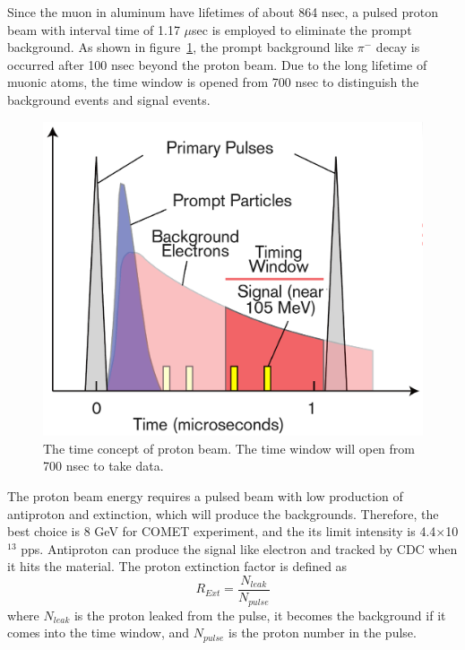 Since the muon in aluminum have lifetimes of about 864 nsec, a pulsed proton beam with interval time of 1.17 $\mu$sec is employed to eliminate the prompt background.
As shown in figure~\ref{time}, the prompt background like $\pi^-$ decay is occurred after 100 nsec beyond the proton beam.
Due to the long lifetime of muonic atoms, the time window is opened from 700 nsec to distinguish the background events and signal events.
\begin{figure}[H]
 \centering
 \includegraphics[scale=0.37]{chapter1/fig/time.pdf}
 \caption{The time concept of proton beam. The time window will open from 700 nsec to take data.}
 \label{time}
\end{figure}
The proton beam energy requires a pulsed beam with low production of antiproton and extinction, which will produce the backgrounds.
Therefore, the best choice is 8 GeV for COMET experiment, and the its limit intensity is 4.4$\times$10$^{13}$ pps.
Antiproton can produce the signal like electron and tracked by CDC when it hits the material.
The proton extinction factor is defined as
\begin{equation}
 R_{Ext} = \frac{N_{leak}}{N_{pulse}}
\end{equation}
where $N_{leak}$ is the proton leaked from the pulse, it becomes the background if it comes into the time window, and $N_{pulse}$ is the proton number in the pulse.

